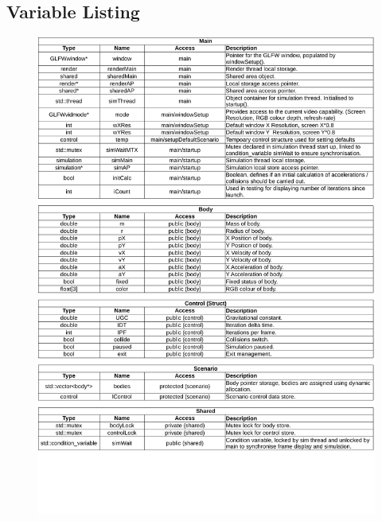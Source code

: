 \subsection{Variable Listing}
\begin{figure}[H]
   \centering
   \includegraphics[page=1, width=\textwidth]{../varlist.pdf} 
\end{figure}

